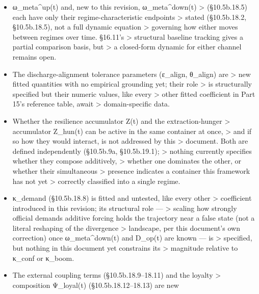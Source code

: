 \documentclass[
]{article}
\begin{document}
\begin{itemize}
  §8.5's network \textgreater{} propagation, are both left to the domain
  adapter by design. \textgreater{} Nothing in the engine can verify
  that a given σ\_i or projection \textgreater{} choice is reasonable
  --- that judgment is inherently substantive \textgreater{} and
  domain-specific.
\item
  ω\_meta\^{}up(t) and, new to this revision, ω\_meta\^{}down(t)
  \textgreater{} (§10.5b.18.5) each have only their
  regime-characteristic endpoints \textgreater{} stated (§10.5b.18.2,
  §10.5b.18.5), not a full dynamic equation \textgreater{} governing how
  either moves between regimes over time. §16.11's \textgreater{}
  structural baseline tracking gives a partial comparison basis, but
  \textgreater{} a closed-form dynamic for either channel remains open.
\item
  The discharge-alignment tolerance parameters (ε\_align, θ\_align) are
  \textgreater{} new fitted quantities with no empirical grounding yet;
  their role \textgreater{} is structurally specified but their numeric
  values, like every \textgreater{} other fitted coefficient in Part
  15's reference table, await \textgreater{} domain-specific data.
\item
  Whether the resilience accumulator Z(t) and the extraction-hunger
  \textgreater{} accumulator Z\_hun(t) can be active in the same
  container at once, \textgreater{} and if so how they would interact,
  is not addressed by this \textgreater{} document. Both are defined
  independently (§10.5b.9a, §10.5b.19.1); \textgreater{} nothing
  currently specifies whether they compose additively, \textgreater{}
  whether one dominates the other, or whether their simultaneous
  \textgreater{} presence indicates a container this framework has not
  yet \textgreater{} correctly classified into a single regime.
\item
  κ\_demand (§10.5b.18.8) is fitted and untested, like every other
  \textgreater{} coefficient introduced in this revision; its structural
  role --- \textgreater{} scaling how strongly official demands additive
  forcing holds the trajectory near a false state (not a literal
  reshaping of the divergence \textgreater{} landscape, per this
  document's own correction) once ω\_meta\^{}down(t) and D\_op(t) are
  known --- is \textgreater{} specified, but nothing in this document
  yet constrains its \textgreater{} magnitude relative to κ\_conf or
  κ\_boom.
\item
  The external coupling terms (§10.5b.18.9--18.11) and the loyalty
  \textgreater{} composition Ψ\_loyal(t) (§10.5b.18.12--18.13) are new

\end{itemize}
\end{document}
